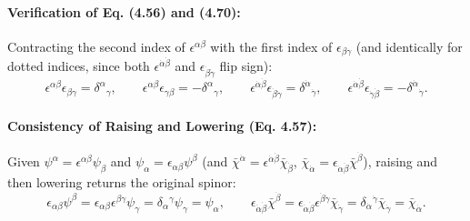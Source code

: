 \documentclass[11pt,a4paper]{article}
\begin{document}
\paragraph{Verification of Eq. (4.56) and (4.70):}
Contracting the second index of $\epsilon^{\alpha\beta}$ with the first index of $\epsilon_{\beta\gamma}$ (and identically for dotted indices, since both $\epsilon^{\dot{\alpha}\dot{\beta}}$ and $\epsilon_{\dot{\beta}\dot{\gamma}}$ flip sign):
\begin{equation}
    \epsilon^{\alpha\beta}\epsilon_{\beta\gamma} = \delta^\alpha{}_\gamma, \qquad \epsilon^{\alpha\beta}\epsilon_{\gamma\beta} = -\delta^\alpha{}_\gamma, \qquad \epsilon^{\dot{\alpha}\dot{\beta}}\epsilon_{\dot{\beta}\dot{\gamma}} = \delta^{\dot{\alpha}}{}_{\dot{\gamma}}, \qquad \epsilon^{\dot{\alpha}\dot{\beta}}\epsilon_{\dot{\gamma}\dot{\beta}} = -\delta^{\dot{\alpha}}{}_{\dot{\gamma}}.
\end{equation}

\paragraph{Consistency of Raising and Lowering (Eq. 4.57):}
Given $\psi^\alpha = \epsilon^{\alpha\beta}\psi_\beta$ and $\psi_\alpha = \epsilon_{\alpha\beta}\psi^\beta$ (and $\bar{\chi}^{\dot{\alpha}} = \epsilon^{\dot{\alpha}\dot{\beta}}\bar{\chi}_{\dot{\beta}}$, $\bar{\chi}_{\dot{\alpha}} = \epsilon_{\dot{\alpha}\dot{\beta}}\bar{\chi}^{\dot{\beta}}$), raising and then lowering returns the original spinor:
\begin{equation}
    \epsilon_{\alpha\beta}\psi^\beta = \epsilon_{\alpha\beta}\epsilon^{\beta\gamma}\psi_\gamma = \delta_\alpha{}^\gamma \psi_\gamma = \psi_\alpha, \qquad \epsilon_{\dot{\alpha}\dot{\beta}}\bar{\chi}^{\dot{\beta}} = \epsilon_{\dot{\alpha}\dot{\beta}}\epsilon^{\dot{\beta}\dot{\gamma}}\bar{\chi}_{\dot{\gamma}} = \delta_{\dot{\alpha}}{}^{\dot{\gamma}}\bar{\chi}_{\dot{\gamma}} = \bar{\chi}_{\dot{\alpha}}.
\end{equation}
\end{document}
